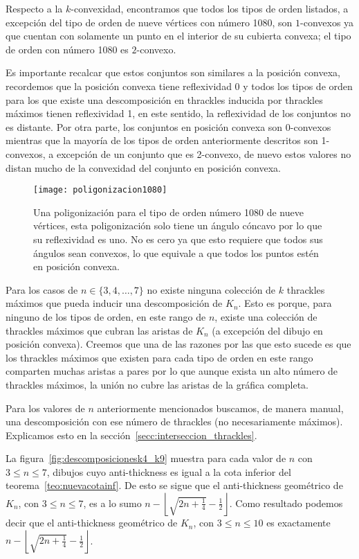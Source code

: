   Respecto a la $k$-convexidad, encontramos que todos los tipos de orden listados, a excepción del
  tipo de orden de nueve vértices con número 1080, son $1$-convexos ya que cuentan con solamente un
  punto en el interior de su cubierta convexa; el tipo de orden con número 1080 es $2$-convexo.

  Es importante recalcar que estos conjuntos son similares a la posición convexa, recordemos que la
  posición convexa tiene reflexividad 0 y todos los tipos de orden para los que existe una
  descomposición en thrackles inducida por thrackles máximos tienen reflexividad 1, en este
  sentido, la reflexividad de los conjuntos no es distante. Por otra parte, los conjuntos en
  posición convexa son $0$-convexos mientras que la mayoría de los tipos de orden anteriormente
  descritos son 1-convexos, a excepción de un conjunto que es 2-convexo, de nuevo estos valores no
  distan mucho de la convexidad del conjunto en posición convexa.

  \begin{figure}
    \centering
    \texttt{[image: poligonizacion1080]}
    \caption{Una poligonización para el tipo de orden número 1080 de nueve vértices, esta poligonización solo tiene un ángulo cóncavo por lo que su reflexividad es uno. No es cero ya que esto requiere que todos sus ángulos sean convexos, lo que equivale a que todos los puntos estén en posición convexa.}
    \label{fig:poligonizacion1080}
  \end{figure}

  Para los casos de $n \in \{3,4,\dots,7\}$ no existe ninguna
  colección de $k$ thrackles máximos que pueda inducir una descomposición de
  $K_n$. Esto es porque, para ninguno de los tipos de orden, en este rango de $n$,
  existe una colección de thrackles máximos que cubran las aristas de $K_n$ (a excepción del
  dibujo en posición convexa). Creemos que una de las razones por las que esto sucede es que los
  thrackles máximos que existen para cada tipo de orden en este rango comparten muchas aristas a
  pares por lo que aunque exista un alto número de thrackles máximos, la unión no cubre las aristas
  de la gráfica completa.

  Para los valores de $n$ anteriormente mencionados buscamos, de manera manual, una descomposición
  con ese número de thrackles (no necesariamente máximos). Explicamos esto en la
  sección~\ref{secc:interseccion_thrackles}.

  La figura~\ref{fig:descomposicionesk4_k9} muestra para cada valor de $n$ con $3\leq n\leq 7$,
  dibujos cuyo anti-thickness  es igual a la cota inferior del teorema~\ref{teo:nuevacotainf}. De
  esto se sigue que el anti-thickness geométrico de $K_n$, con $ 3 \leq n \leq 7$, es a lo
  sumo $n - \left\lfloor\sqrt{2n+\frac{1}{4}} - \frac{1}{2}\right\rfloor$.
  Como resultado podemos decir que el anti-thickness geométrico de $K_n$, con $ 3\leq n \leq 10$
  es exactamente $n - \left\lfloor\sqrt{2n+\frac{1}{4}} - \frac{1}{2}\right\rfloor$.

